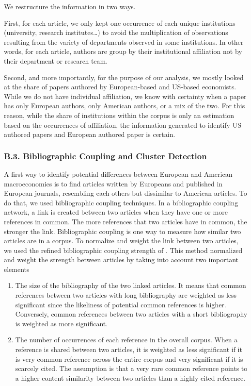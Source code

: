 \documentclass[]{elsarticle} %
\providecommand{\tightlist}{%
  \setlength{\itemsep}{0pt}\setlength{\parskip}{0pt}}
\begin{document}
We restructure the information in two ways.

First, for each article, we only kept one occurrence of each unique
institutions (university, research institutes\ldots) to avoid the
multiplication of observations resulting from the variety of departments
observed in some institutions. In other words, for each article, authors
are group by their institutional affiliation not by their department or
research team.

Second, and more importantly, for the purpose of our analysis, we mostly
looked at the share of papers authored by European-based and US-based
economists. While we do not have individual affiliation, we know with
certainty when a paper has only European authors, only American authors,
or a mix of the two. For this reason, while the share of institutions
within the corpus is only an estimation based on the occurrences of
affiliation, the information generated to identify US authored papers
and European authored paper is certain.

\hypertarget{network}{%
\subsubsection*{B.3. Bibliographic Coupling and Cluster
Detection}\label{network}}

A first way to identify potential differences between European and
American macroeconomics is to find articles written by Europeans and
published in European journals, resembling each others but dissimilar to
American articles. To do that, we used bibliographic coupling
techniques. In a bibliographic coupling network, a link is created
between two articles when they have one or more references in common.
The more references that two articles have in common, the stronger the
link. Bibliographic coupling is one way to measure how similar two
articles are in a corpus. To normalize and weight the link between two
articles, we used the refined bibliographic coupling strength of
\citet{shen2019}. This method normalized and weight the strength between
articles by taking into account two important elements

\begin{enumerate}
\def\labelenumi{\arabic{enumi}.}
\tightlist
\item
  The size of the bibliography of the two linked articles. It means that
  common references between two articles with long bibliography are
  weighted as less significant since the likeliness of potential common
  references is higher. Conversely, common references between two
  articles with a short bibliography is weighted as more significant.
\item
  The number of occurrences of each reference in the overall corpus.
  When a reference is shared between two articles, it is weighted as
  less significant if it is very common reference across the entire
  corpus and very significant if it is scarcely cited. The assumption is
  that a very rare common reference points to a higher content
  similarity between two articles than a highly cited reference.
\end{enumerate}
\end{document}

